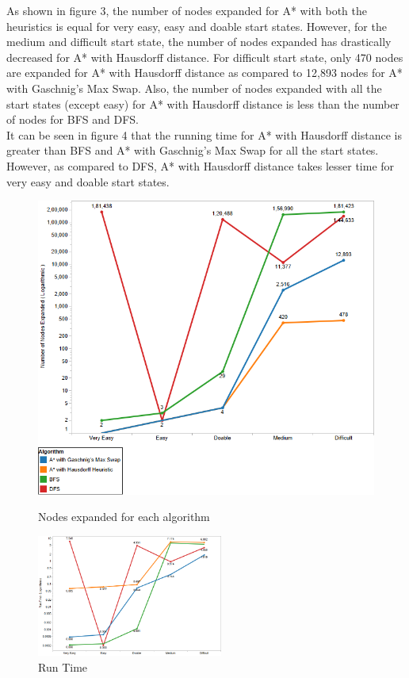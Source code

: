 \documentclass{svproc}
\begin{document}
\noindent As shown in figure 3, the number of nodes expanded for A* with both the heuristics is equal for very easy, easy and doable start states. However, for the medium and difficult start state, the number of nodes expanded has drastically decreased for A* with Hausdorff distance. For difficult start state, only 470 nodes are expanded for A* with Hausdorff distance as compared to 12,893 nodes for A* with Gaschnig's Max Swap. Also, the number of nodes expanded with all the start states (except easy) for A* with Hausdorff distance is less than the number of nodes for BFS and DFS. \\

\noindent It can be seen in figure 4 that the running time for A* with Hausdorff distance is greater than BFS and A* with Gaschnig's Max Swap for all the start states. However, as compared to DFS,  A* with Hausdorff distance takes lesser time for very easy and doable start states.

\begin{figure}[H]
	\centering
	\begin{minipage}[b]{0.5\textwidth}
		\includegraphics[width=\textwidth]{Images/Nodes_expanded.png}
		\caption{Nodes expanded for each algorithm}
	\end{minipage}
	\hfill
	\begin{minipage}[b]{0.4\textwidth}
		\includegraphics[width=\textwidth, height=4cm]{Images/RunningTime.png}
		\caption{Run Time}
	\end{minipage}
\end{figure}
\end{document}
